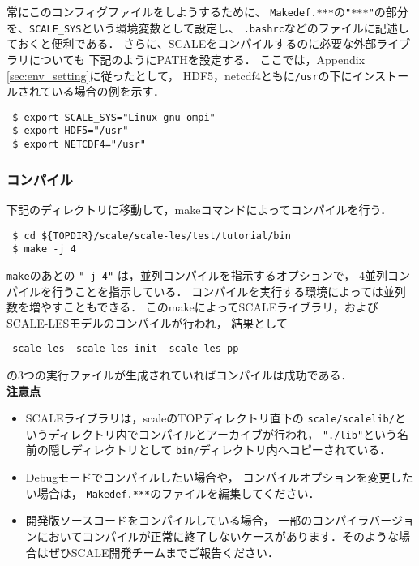 常にこのコンフィグファイルをしようするために、
\verb|Makedef.***|の\verb|"***"|の部分を、\verb|SCALE_SYS|という環境変数として設定し、
\verb|.bashrc|などのファイルに記述しておくと便利である．
さらに、SCALEをコンパイルするのに必要な外部ライブラリについても
下記のようにPATHを設定する．
ここでは，Appendix \ref{sec:env_setting}に従ったとして，
HDF5，netcdf4ともに\verb|/usr|の下にインストールされている場合の例を示す．

\begin{verbatim}
 $ export SCALE_SYS="Linux-gnu-ompi"
 $ export HDF5="/usr"
 $ export NETCDF4="/usr"
\end{verbatim}


\subsubsection{コンパイル}

下記のディレクトリに移動して，makeコマンドによってコンパイルを行う．
\begin{verbatim}
 $ cd ${TOPDIR}/scale/scale-les/test/tutorial/bin
 $ make -j 4
\end{verbatim}
\verb|make|のあとの \verb|"-j 4"| は，並列コンパイルを指示するオプションで，
4並列コンパイルを行うことを指示している．
コンパイルを実行する環境によっては並列数を増やすこともできる．
このmakeによってSCALEライブラリ，およびSCALE-LESモデルのコンパイルが行われ，
結果として
\begin{verbatim}
 scale-les  scale-les_init  scale-les_pp
\end{verbatim}
の3つの実行ファイルが生成されていればコンパイルは成功である．\\


{\bf 注意点}
\begin{itemize}
\item SCALEライブラリは，scaleのTOPディレクトリ直下の
 \verb|scale/scalelib/|というディレクトリ内でコンパイルとアーカイブが行われ，
 \verb|"./lib"|という名前の隠しディレクトリとして
 \verb|bin/|ディレクトリ内へコピーされている．
\item Debugモードでコンパイルしたい場合や，
 コンパイルオプションを変更したい場合は，
 \verb|Makedef.***|のファイルを編集してください．
\item 開発版ソースコードをコンパイルしている場合，
 一部のコンパイラバージョンにおいてコンパイルが正常に終了しないケースがあります．そのような場合はぜひSCALE開発チームまでご報告ください．
\end{itemize}



